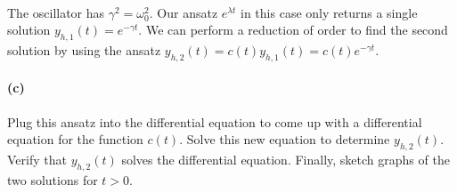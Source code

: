 \documentclass{article}
\begin{document}
\phline
\paragraph{}
The  oscillator has $\gamma^{2} = \omega_{0}^{2}$.  Our ansatz $e^{\lambda t}$ in this case only returns a single solution 
$y_{h,1}(t) = e^{-\gamma t}$.  We can perform a reduction of order to find the second solution by using the ansatz $y_{h,2}(t) = c(t)y_{h,1}(t) 
= c(t)e^{-\gamma t}$.


\paragraph{(c)}
Plug this ansatz into the differential equation to come up with a differential equation for the function $c(t)$.  Solve this new equation to determine $y_{h,2}(t)$.  Verify that
$y_{h,2}(t)$ solves the differential equation.  Finally, sketch graphs of the two solutions for $t>0$.\\
\end{document}
